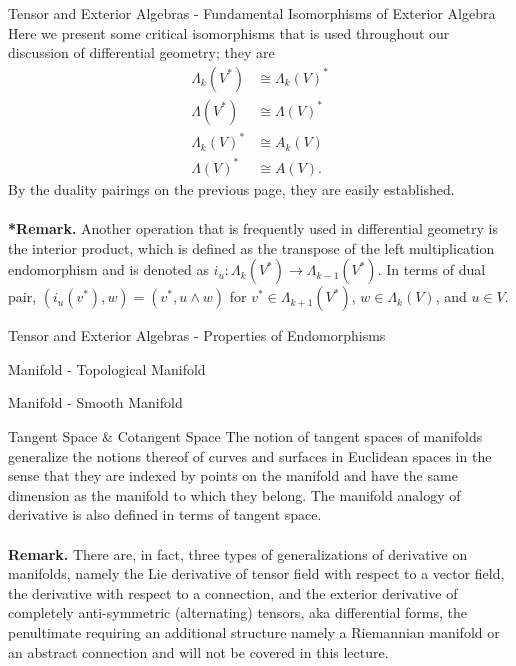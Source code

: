 \documentclass[aspectratio=169]{beamer}
\begin{document}
\begin{frame}{Tensor and Exterior Algebras - Fundamental Isomorphisms of Exterior Algebra}
Here we present some critical isomorphisms that is used throughout our discussion of differential geometry; they are
\begin{align*}
\Lambda_k(V^*)&\cong\Lambda_k(V)^*\\
\Lambda(V^*)&\cong\Lambda(V)^*\\
\Lambda_k(V)^*&\cong A_{k}(V)\\
\Lambda(V)^*&\cong A(V).
\end{align*}
By the duality pairings on the previous page, they are easily established.
\\~\\
\textbf{*Remark.} Another operation that is frequently used in differential geometry is the \alert{interior product}, which is defined as the transpose of the left multiplication endomorphism and is denoted as $i_u:\Lambda_k(V^*)\to\Lambda_{k-1}(V^*)$. In terms of dual pair, $(i_u(v^*),w)=(v^*,u\wedge w)$ for $v^*\in\Lambda_{k+1}(V^*)$, $w\in\Lambda_k(V)$, and $u\in V$.
\end{frame}
\begin{frame}{Tensor and Exterior Algebras - Properties of Endomorphisms}
\end{frame}
\begin{frame}{Manifold - Topological Manifold}
\end{frame}
\begin{frame}{Manifold - Smooth Manifold}
\end{frame}
\begin{frame}{Tangent Space \& Cotangent Space}
The notion of tangent spaces of manifolds generalize the notions thereof of curves and surfaces in Euclidean spaces in the sense that they are indexed by points on the manifold and have the same dimension as the manifold to which they belong. The manifold analogy of derivative is also defined in terms of tangent space.
\\~\\
\textbf{Remark.} There are, in fact, three types of generalizations of derivative on manifolds, namely the Lie derivative of tensor field with respect to a vector field, the derivative with respect to a connection, and the exterior derivative of completely anti-symmetric (alternating) tensors, aka differential forms, the penultimate requiring an additional structure namely a Riemannian manifold or an abstract connection and will not be covered in this lecture.
\end{frame}
\end{document}
